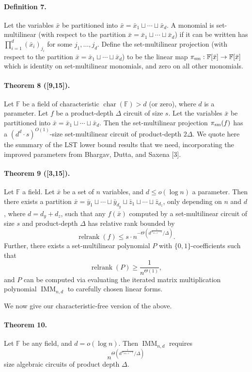 \documentclass[10pt,a4paper]{article}
\begin{document}
\paragraph{Definition 7.} Let the variables $\bar x$ be partitioned into $\bar x=\bar x_1\sqcup\cdots\sqcup\bar x_d$. A monomial is set-multilinear (with respect to the partition $\bar x=\bar x_1\sqcup\cdots\sqcup\bar x_d$) if it can be written has $\prod_{i=1}^d(\bar x_i)_{j_i}$ for some $j_1,\ldots,j_d$.
Define the set-multilinear projection (with respect to the partition $\bar x=\bar x_1\sqcup\cdots\sqcup\bar x_d$) to be the linear map $\pi_{\rm sm}:\mathbb F[\bar x]\to\mathbb F[\bar x]$ which is identity on set-multilinear monomials, and zero on all other monomials.
\paragraph{Theorem 8 ([9,15]).} Let $\mathbb F$ be a field of characteristic $\operatorname{char}(\mathbb F)>d$ (or zero), where $d$ is a parameter. Let $f$ be a product-depth $\Delta$ circuit of size $s$. Let the variables $\bar x$ be partitioned into $\bar x=\bar x_1\sqcup\cdots\sqcup\bar x_d$. Then the set-multilinear projection $\pi_{\rm sm}(f)$ has a $(d^d\cdot s)^{O(1)}$-size set-multilinear circuit of product-depth $2\Delta$.
We quote here the summary of the LST lower bound results that we need, incorporating the improved parameters from Bhargav, Dutta, and Saxena [3].
\paragraph{Theorem 9 ([3,15]).} Let $\mathbb F$ a field. Let $\bar x$ be a set of $n$ variables, and $d\le o(\log n)$ a parameter. Then there exists a partition $\bar x=\bar y_1\sqcup\cdots\sqcup\bar y_{d_y}\sqcup\bar z_1\sqcup\cdots\sqcup\bar z_{d_z}$, only depending on $n$ and $d$, where $d=d_y+d_z$, such that any $f(\bar x)$ computed by a set-multilinear circuit of size $s$ and product-depth $\Delta$ has relative rank bounded by
\[\operatorname{relrank}(f)\le s\cdot n^{-\Theta(d^{\frac1{F_{\Delta+2}-1}}/\Delta)}.\]
Further, there exists a set-multilinear polynomial $P$ with $\{0,1\}$-coefficients such that
\[\operatorname{relrank}(P)\ge\frac1{n^{\Theta(1)}},\]
and $P$ can be computed via evaluating the iterated matrix multiplication polynomial $\operatorname{IMM}_{n,d}$ to carefully chosen linear forms.

We now give our characteristic-free version of the above.
\paragraph{Theorem 10.} Let $\mathbb F$ be any field, and $d=o(\log n)$. Then $\operatorname{IMM}_{n,d}$ requires
\[n^{\Theta(d^{\frac1{F_{2\Delta+2}-1}}/\Delta)}\]
size algebraic circuits of product depth $\Delta$.
\end{document}
